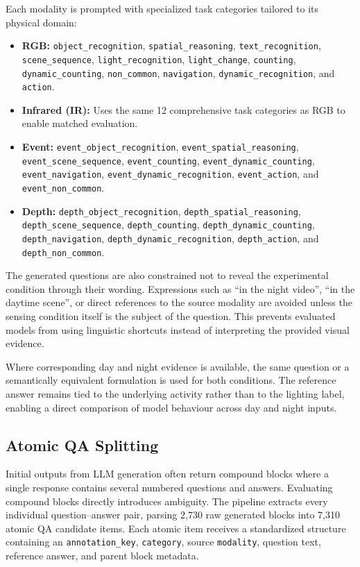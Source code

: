 Each modality is prompted with specialized task categories tailored to its physical domain:
\begin{itemize}
    \item \textbf{RGB:} \texttt{object\_recognition}, \texttt{spatial\_reasoning}, \texttt{text\_recognition},
          \texttt{scene\_sequence}, \texttt{light\_recognition}, \texttt{light\_change}, \texttt{counting}, \texttt{dynamic\_counting}, \texttt{non\_common}, \texttt{navigation}, \texttt{dynamic\_recognition}, and \texttt{action}.
    \item \textbf{Infrared (IR):} Uses the same 12 comprehensive task categories as RGB to enable matched evaluation.
    \item \textbf{Event:} \texttt{event\_object\_recognition}, \texttt{event\_spatial\_reasoning}, \texttt{event\_scene\_sequence},
          \texttt{event\_counting}, \texttt{event\_dynamic\_counting}, \texttt{event\_navigation}, \texttt{event\_dynamic\_recognition}, \texttt{event\_action}, and \texttt{event\_non\_common}.
    \item \textbf{Depth:} \texttt{depth\_object\_recognition}, \texttt{depth\_spatial\_reasoning}, \texttt{depth\_scene\_sequence},
          \texttt{depth\_counting}, \texttt{depth\_dynamic\_counting}, \texttt{depth\_navigation}, \texttt{depth\_dynamic\_recognition}, \texttt{depth\_action}, and \texttt{depth\_non\_common}.
\end{itemize}

The generated questions are also constrained not to reveal the experimental
condition through their wording. Expressions such as ``in the night video'',
``in the daytime scene'', or direct references to the source modality are
avoided unless the sensing condition itself is the subject of the question.
This prevents evaluated models from using linguistic shortcuts instead of
interpreting the provided visual evidence.

Where corresponding day and night evidence is available, the same question or
a semantically equivalent formulation is used for both conditions. The
reference answer remains tied to the underlying activity rather than to the
lighting label, enabling a direct comparison of model behaviour across day and
night inputs.

\subsection{Atomic QA Splitting}

Initial outputs from LLM generation often return compound blocks where a single response contains
several numbered questions and answers. Evaluating compound blocks directly introduces ambiguity.
The pipeline extracts every individual question--answer pair, parsing 2,730 raw generated blocks
into 7,310 atomic QA candidate items. Each atomic item receives a standardized structure containing an
\texttt{annotation\_key}, \texttt{category}, source \texttt{modality}, question text, reference answer,
and parent block metadata.


